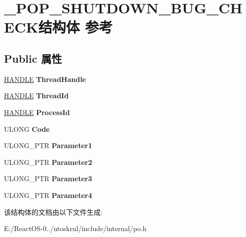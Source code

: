 \hypertarget{struct___p_o_p___s_h_u_t_d_o_w_n___b_u_g___c_h_e_c_k}{}\section{\+\_\+\+P\+O\+P\+\_\+\+S\+H\+U\+T\+D\+O\+W\+N\+\_\+\+B\+U\+G\+\_\+\+C\+H\+E\+C\+K结构体 参考}
\label{struct___p_o_p___s_h_u_t_d_o_w_n___b_u_g___c_h_e_c_k}
\subsection*{Public 属性}
\begin{DoxyCompactItemize}
\item 
\mbox{\label{struct___p_o_p___s_h_u_t_d_o_w_n___b_u_g___c_h_e_c_k_a962d238756e0968805f7f74a248600f1}} 
\hyperlink{interfacevoid}{H\+A\+N\+D\+LE} {\bfseries Thread\+Handle}
\item 
\mbox{\label{struct___p_o_p___s_h_u_t_d_o_w_n___b_u_g___c_h_e_c_k_a20005f16f19155ef300a31a2d0a43f61}} 
\hyperlink{interfacevoid}{H\+A\+N\+D\+LE} {\bfseries Thread\+Id}
\item 
\mbox{\label{struct___p_o_p___s_h_u_t_d_o_w_n___b_u_g___c_h_e_c_k_a6a8f82643aca73536ebad0891b97e1a6}} 
\hyperlink{interfacevoid}{H\+A\+N\+D\+LE} {\bfseries Process\+Id}
\item 
\mbox{\label{struct___p_o_p___s_h_u_t_d_o_w_n___b_u_g___c_h_e_c_k_aea0f4f900bb62c2a8a8f3bbb02b33b37}} 
U\+L\+O\+NG {\bfseries Code}
\item 
\mbox{\label{struct___p_o_p___s_h_u_t_d_o_w_n___b_u_g___c_h_e_c_k_a0daab6296fbefa9a367f0938d9f61968}} 
U\+L\+O\+N\+G\+\_\+\+P\+TR {\bfseries Parameter1}
\item 
\mbox{\label{struct___p_o_p___s_h_u_t_d_o_w_n___b_u_g___c_h_e_c_k_aa2ae20ab7b6897c802b5c126ce5b16a9}} 
U\+L\+O\+N\+G\+\_\+\+P\+TR {\bfseries Parameter2}
\item 
\mbox{\label{struct___p_o_p___s_h_u_t_d_o_w_n___b_u_g___c_h_e_c_k_acb37f73485440e53e9503efba82f2d0d}} 
U\+L\+O\+N\+G\+\_\+\+P\+TR {\bfseries Parameter3}
\item 
\mbox{\label{struct___p_o_p___s_h_u_t_d_o_w_n___b_u_g___c_h_e_c_k_a349ed841aacab93aeae927065a15fbd8}} 
U\+L\+O\+N\+G\+\_\+\+P\+TR {\bfseries Parameter4}
\end{DoxyCompactItemize}


该结构体的文档由以下文件生成\+:\begin{DoxyCompactItemize}
\item 
E\+:/\+React\+O\+S-\/0../ntoskrnl/include/internal/po.\+h\end{DoxyCompactItemize}
